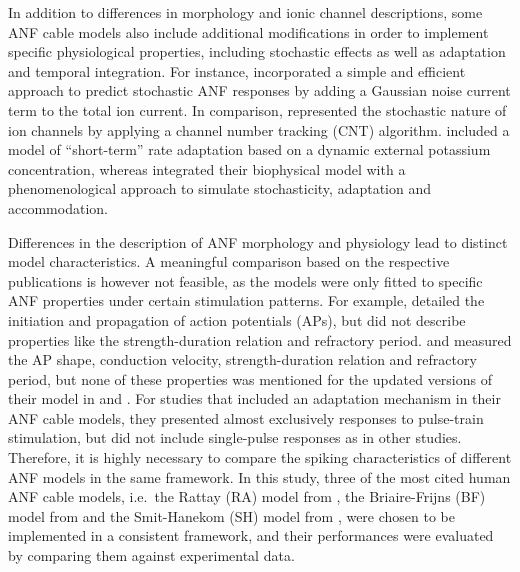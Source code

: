 \documentclass[utf8]{frontiersSCNS} %
\begin{document}
In addition to differences in morphology and ionic channel descriptions, some ANF cable models also include additional modifications in order to implement specific physiological properties,  including stochastic effects as well as adaptation and temporal integration. For instance, \cite{Rattay2001} incorporated a simple and efficient approach to predict stochastic ANF responses by adding a Gaussian noise current term to the total ion current. In comparison, \cite{Imennov2009} represented the stochastic nature of ion channels by applying a channel number tracking (CNT) algorithm. \cite{Woo2010} included a model of ``short-term'' %
 rate adaptation based on a dynamic external potassium concentration, whereas \cite{VanGendt2016} integrated their biophysical model with a phenomenological approach to simulate stochasticity, %
 adaptation and accommodation. 

Differences in the description of ANF morphology and physiology lead to distinct model characteristics. A meaningful comparison based on the respective publications is however not feasible, as the models were only fitted to specific ANF properties under certain stimulation patterns. For example, \cite{Rattay2001} detailed the initiation and propagation of action potentials (APs), but did not describe properties like the strength-duration relation and refractory period. \cite{Frijns1994} and \cite{Smit2008} measured the AP shape, conduction velocity, strength-duration relation and refractory period, but none of these properties was mentioned for the updated versions of their model in \cite{Briaire2005} and \cite{Smit2010}. For studies that included an adaptation mechanism in their ANF cable models, they presented almost exclusively responses to pulse-train stimulation, but did not include single-pulse responses as in other studies. Therefore, it is highly necessary 
to compare the spiking characteristics of different ANF models in the same framework. In this study, three of the most cited human ANF cable models, i.e.\ the Rattay (RA) model from \cite{Rattay2001}, the Briaire-Frijns (BF) model from \cite{Briaire2005} and the Smit-Hanekom (SH) model from \cite{Smit2010}, were chosen to be implemented in a consistent framework, and their performances were evaluated by comparing them against experimental data.
\end{document}
